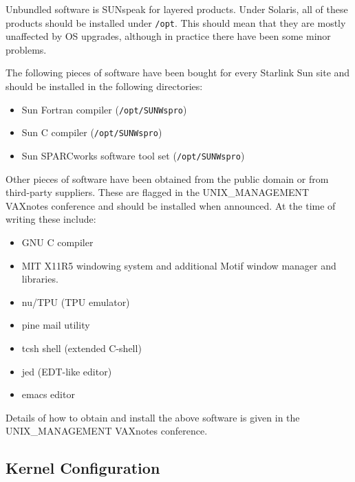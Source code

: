 Unbundled software is SUNspeak for layered products.
Under Solaris, all of these products should be installed under \verb+/opt+.
This should mean that they are mostly unaffected by OS upgrades,
although in practice there have been some minor problems.

The following pieces of software have been bought for every Starlink
Sun site and should be installed in the following directories:

\begin{itemize}

\item	Sun Fortran compiler ({\tt /opt/SUNWspro})
\item	Sun C compiler ({\tt /opt/SUNWspro})
\item   Sun SPARCworks software tool set ({\tt /opt/SUNWspro})

\end{itemize}

Other pieces of software have been obtained from the public domain
or from third-party suppliers. These are flagged in the
UNIX\_MANAGEMENT VAXnotes conference and should be installed when announced.
At the time of writing these include:

\begin{itemize}

\item GNU C compiler

\item MIT X11R5 windowing system and additional Motif window manager and
libraries.

\item nu/TPU (TPU emulator)

\item pine mail utility

\item tcsh shell (extended C-shell)

\item jed (EDT-like editor)

\item emacs editor

\end{itemize}

Details of how to obtain and install the above software is given in
the UNIX\_MANAGEMENT VAXnotes conference.

\subsection{Kernel Configuration}

